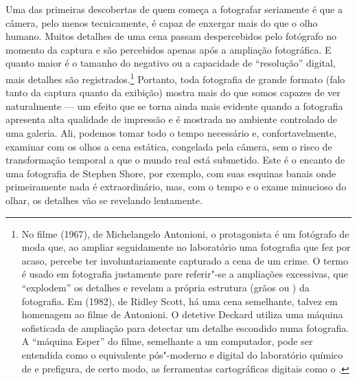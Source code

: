 Uma das primeiras descobertas de quem começa a fotografar seriamente é
que a câmera, pelo menos tecnicamente, é capaz de enxergar mais do que o
olho humano. Muitos detalhes de uma cena passam despercebidos pelo
fotógrafo no momento da captura e são percebidos apenas após a ampliação
fotográfica. E quanto maior é o tamanho do negativo ou a capacidade de
``resolução'' digital, mais detalhes são registrados.\footnote{No filme
  {} (1967), de Michelangelo Antonioni, o protagonista é um
  fotógrafo de moda que, ao ampliar seguidamente no laboratório uma
  fotografia que fez por acaso, percebe ter involuntariamente capturado
  a cena de um crime. O termo {} é usado em fotografia
  justamente pare referir"-se a ampliações excessivas, que ``explodem''
  os detalhes e revelam a própria estrutura (grãos ou {}) da
  fotografia. Em {} (1982), de Ridley Scott, há uma
  cena semelhante, talvez em homenagem ao filme de Antonioni. O detetive
  Deckard utiliza uma máquina sofisticada de ampliação para detectar um
  detalhe escondido numa fotografia. A ``máquina Esper'' do filme,
  semelhante a um computador, pode ser entendida como o equivalente
  pós"-moderno e digital do laboratório químico de {} e
  prefigura, de certo modo, as ferramentas cartográficas digitais como o
  {}.} Portanto, toda fotografia de grande formato
(falo tanto da captura quanto da exibição) mostra mais do que somos
capazes de ver naturalmente --- um efeito que se torna ainda mais
evidente quando a fotografia apresenta alta qualidade de impressão e é
mostrada no ambiente controlado de uma galeria. Ali, podemos tomar todo
o tempo necessário e, confortavelmente, examinar com os olhos a cena
estática, congelada pela câmera, sem o risco de transformação temporal a
que o mundo real está submetido. Este é o encanto de uma fotografia de
Stephen Shore, por exemplo, com suas esquinas banais onde primeiramente
nada é extraordinário, mas, com o tempo e o exame minucioso do olhar, os
detalhes vão se revelando lentamente.

